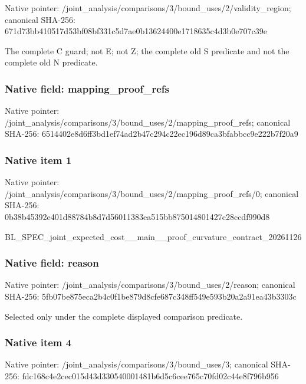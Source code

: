 \documentclass[10pt,a4paper]{article}
\begin{document}
Native pointer: /joint\_analysis/comparis\allowbreak{}ons/3/bound\_uses/2/valid\allowbreak{}ity\_region; canonical SHA-256: 671d73bb410517d53bf08bf3\allowbreak{}31c5d7ae0b13624400e17186\allowbreak{}35c4d3b0e707c39e


The complete C guard; not E; not Z; the complete old S predicate and not the complete old N predicate.


\subsubsection{Native field: mapping\_proof\_refs}


Native pointer: /joint\_analysis/comparis\allowbreak{}ons/3/bound\_uses/2/mappi\allowbreak{}ng\_proof\_refs; canonical SHA-256: 6514402e8d6ff3bd1ef74ad2\allowbreak{}b47c294c22ec196d89ca3bfa\allowbreak{}bbcc9e222b7f20a9



\subsubsection{Native item 1}


Native pointer: /joint\_analysis/comparis\allowbreak{}ons/3/bound\_uses/2/mappi\allowbreak{}ng\_proof\_refs/0; canonical SHA-256: 0b38b45392e401d88784b8d7\allowbreak{}d56011383ea515bb87501480\allowbreak{}1427c28ccdf990d8


BL\_SPEC\_joint\_expected\_c\allowbreak{}ost\_\_main\_\_proof\_curvatu\allowbreak{}re\_contract\_20261126


\subsubsection{Native field: reason}


Native pointer: /joint\_analysis/comparis\allowbreak{}ons/3/bound\_uses/2/reaso\allowbreak{}n; canonical SHA-256: 5fb07be875eca2b4c0f1be87\allowbreak{}9d8cfe687c348ff549e593b2\allowbreak{}0a2a91ea43b3303c


Selected only under the complete displayed comparison predicate.


\subsubsection{Native item 4}


Native pointer: /joint\_analysis/comparis\allowbreak{}ons/3/bound\_uses/3; canonical SHA-256: fdc168c4e2cec015d43d3305\allowbreak{}40001481b6d5c6cee765c70f\allowbreak{}d02c44e8f796b956
\end{document}
